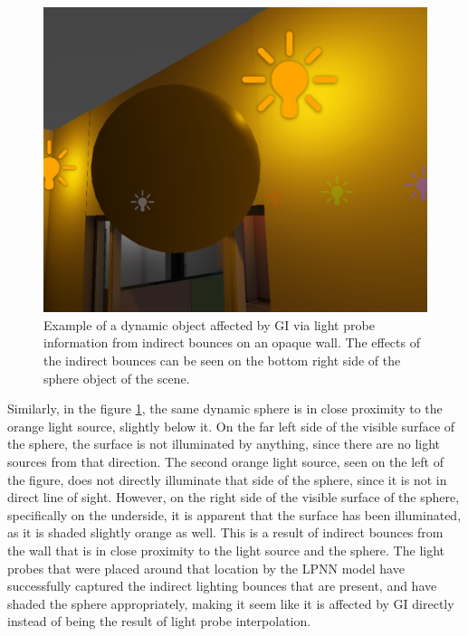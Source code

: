 \begin{figure}[h]
	\centering
	\includegraphics[width=\linewidth]{Graphics/results/tests/office_c.jpg}
	\caption{Example of a dynamic object affected by GI via light probe information from indirect bounces on an opaque wall. The effects of the indirect bounces can be seen on the bottom right side of the sphere object of the scene.}
	\label{fig:office_test_b}
\end{figure}

Similarly, in the figure \ref{fig:office_test_b}, the same dynamic sphere is in close proximity to the orange light source, slightly below it. On the far left side of the visible surface of the sphere, the surface is not illuminated by anything, since there are no light sources from that direction. The second orange light source, seen on the left of the figure, does not directly illuminate that side of the sphere, since it is not in direct line of sight. However, on the right side of the visible surface of the sphere, specifically on the underside, it is apparent that the surface has been illuminated, as it is shaded slightly orange as well. This is a result of indirect bounces from the wall that is in close proximity to the light source and the sphere. The light probes that were placed around that location by the LPNN model have successfully captured the indirect lighting bounces that are present, and have shaded the sphere appropriately, making it seem like it is affected by GI directly instead of being the result of light probe interpolation.\newline

